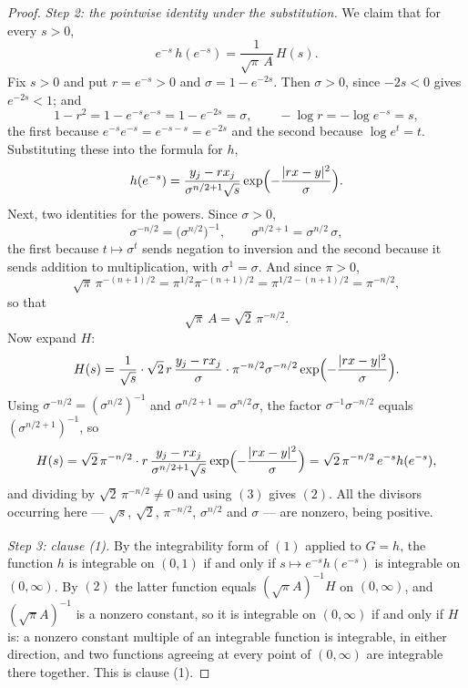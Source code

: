 \begin{proof}
\emph{Step 2: the pointwise identity under the substitution.}
We claim that for every $s > 0$,
\begin{equation*}
  e^{-s}\,h(e^{-s}) = \frac{1}{\sqrt\pi\,A}\,H(s) . \tag{2}
\end{equation*}
Fix $s > 0$ and put $r = e^{-s} > 0$ and $\sigma = 1-e^{-2s}$.  Then
$\sigma > 0$, since $-2s < 0$ gives $e^{-2s} < 1$; and
\[
  1 - r^2 = 1 - e^{-s}e^{-s} = 1 - e^{-2s} = \sigma ,
  \qquad
  -\log r = -\log e^{-s} = s ,
\]
the first because $e^{-s}e^{-s} = e^{-s-s} = e^{-2s}$ and the second because
$\log e^{t} = t$.  Substituting these into the formula for $h$,
\[
  h(e^{-s})
    = \frac{y_j - rx_j}{\sigma^{n/2+1}\sqrt s}
      \exp\Bigl(-\frac{|rx-y|^2}{\sigma}\Bigr) .
\]
Next, two identities for the powers.  Since $\sigma > 0$,
\[
  \sigma^{-n/2} = \bigl(\sigma^{n/2}\bigr)^{-1},
  \qquad
  \sigma^{n/2+1} = \sigma^{n/2}\,\sigma ,
\]
the first because $t \mapsto \sigma^t$ sends negation to inversion and the
second because it sends addition to multiplication, with $\sigma^1 = \sigma$.
And since $\pi > 0$,
\[
  \sqrt\pi\,\pi^{-(n+1)/2} = \pi^{1/2}\pi^{-(n+1)/2} = \pi^{1/2-(n+1)/2}
    = \pi^{-n/2} ,
\]
so that
\begin{equation*}
  \sqrt\pi\,A = \sqrt2\,\pi^{-n/2} . \tag{3}
\end{equation*}
Now expand $H$:
\[
  H(s) = \frac{1}{\sqrt s}\cdot
    \sqrt2\,r\,\frac{y_j-rx_j}{\sigma}\cdot
      \pi^{-n/2}\sigma^{-n/2}\exp\Bigl(-\frac{|rx-y|^2}{\sigma}\Bigr) .
\]
Using $\sigma^{-n/2} = (\sigma^{n/2})^{-1}$ and $\sigma^{n/2+1} = \sigma^{n/2}\sigma$,
the factor $\sigma^{-1}\sigma^{-n/2}$ equals $(\sigma^{n/2+1})^{-1}$, so
\[
  H(s) = \sqrt2\,\pi^{-n/2}\cdot
    r\,\frac{y_j-rx_j}{\sigma^{n/2+1}\sqrt s}
      \exp\Bigl(-\frac{|rx-y|^2}{\sigma}\Bigr)
    = \sqrt2\,\pi^{-n/2}\,e^{-s}h(e^{-s}) ,
\]
and dividing by $\sqrt2\,\pi^{-n/2} \neq 0$ and using $(3)$ gives $(2)$.  All the
divisors occurring here --- $\sqrt s$, $\sqrt 2$, $\pi^{-n/2}$, $\sigma^{n/2}$
and $\sigma$ --- are nonzero, being positive.

\emph{Step 3: clause (1).}
By the integrability form of $(1)$ applied to $G = h$, the function $h$ is
integrable on $(0,1)$ if and only if $s \mapsto e^{-s}h(e^{-s})$ is integrable
on $(0,\infty)$.  By $(2)$ the latter function equals $(\sqrt\pi A)^{-1}H$ on
$(0,\infty)$, and $(\sqrt\pi A)^{-1}$ is a nonzero constant, so it is integrable
on $(0,\infty)$ if and only if $H$ is: a nonzero constant multiple of an
integrable function is integrable, in either direction, and two functions
agreeing at every point of $(0,\infty)$ are integrable there together.  This is
clause (1).


\end{proof}
